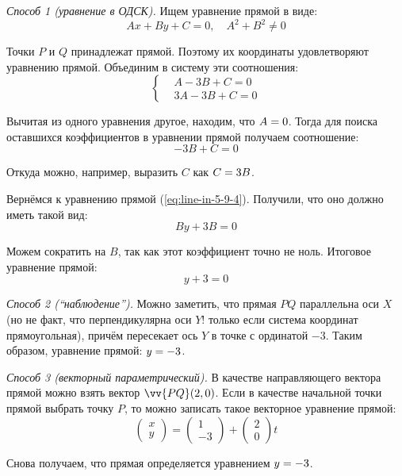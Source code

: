 \documentclass[a4paper,12pt]{article}
\begin{document}
  \begin{solution}
    \leavevmode
    
    \emph{Способ 1 (уравнение в ОДСК).}
    Ищем уравнение прямой в виде:
    \begin{equation}\label{eq:line-in-5-9-4}
      Ax + By + C = 0,\quad A^2 + B^2 \not= 0
    \end{equation}
    
    Точки $P$ и $Q$ принадлежат прямой.
    Поэтому их координаты удовлетворяют уравнению прямой.
    Объединим в систему эти соотношения:
    \[
      \left\{
        \begin{aligned}
          &A - 3B + C = 0\\
          &3A - 3B + C = 0
        \end{aligned}
      \right.
    \]
    
    Вычитая из одного уравнения другое, находим, что $A \hm= 0$.
    Тогда для поиска оставшихся коэффициентов в уравнении прямой получаем соотношение:
    \[
      -3B + C = 0
    \]
    
    Откуда можно, например, выразить $C$ как $C \hm= 3B$.
    
    Вернёмся к уравнению прямой (\ref{eq:line-in-5-9-4}).
    Получили, что оно должно иметь такой вид:
    \[
      By + 3B = 0
    \]
    
    Можем сократить на $B$, так как этот коэффициент точно не ноль.
    Итоговое уравнение прямой:
    \[
      y + 3 = 0
    \]
    
    \medskip
    
    \emph{Способ 2 (``наблюдение'').}
    Можно заметить, что прямая $PQ$ параллельна оси $X$ (но не факт, что перпендикулярна оси $Y$! только если система координат прямоугольная), причём пересекает ось $Y$ в точке с ординатой $-3$.
    Таким образом, уравнение прямой: $y \hm= -3$.
    
    \medskip
    
    \emph{Способ 3 (векторный параметрический).}
    В качестве направляющего вектора прямой можно взять вектор $\vv{PQ}(2, 0)$.
    Если в качестве начальной точки прямой выбрать точку $P$, то можно записать такое векторное уравнение прямой:
    \[
      \begin{pmatrix}
        x\\y
      \end{pmatrix} = \begin{pmatrix}
        1\\-3
      \end{pmatrix} + \begin{pmatrix}
        2\\0
      \end{pmatrix} t
    \]
    
    Снова получаем, что прямая определяется уравнением $y \hm= -3$.
  \end{solution}
  
\end{document}
